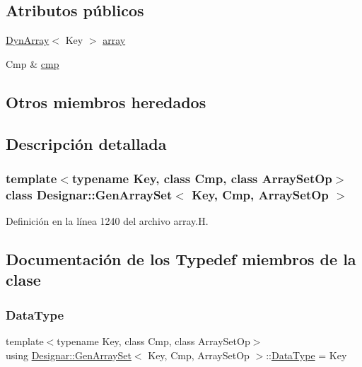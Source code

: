 \subsection*{Atributos públicos}
\begin{DoxyCompactItemize}
\item 
\hyperlink{class_designar_1_1_dyn_array}{Dyn\+Array}$<$ Key $>$ \hyperlink{class_designar_1_1_gen_array_set_a8118f689e762c993ed0ba7394a8f480a}{array}
\item 
Cmp \& \hyperlink{class_designar_1_1_gen_array_set_a2b1e3c653865a794eab7d19e43c1b0de}{cmp}
\end{DoxyCompactItemize}
\subsection*{Otros miembros heredados}


\subsection{Descripción detallada}
\subsubsection*{template$<$typename Key, class Cmp, class Array\+Set\+Op$>$\newline
class Designar\+::\+Gen\+Array\+Set$<$ Key, Cmp, Array\+Set\+Op $>$}



Definición en la línea 1240 del archivo array.\+H.



\subsection{Documentación de los \textquotesingle{}Typedef\textquotesingle{} miembros de la clase}
\mbox{\label{class_designar_1_1_gen_array_set_ac69f0c0b76358cd5effd2dc05bd724ee}} 
\subsubsection{\texorpdfstring{Data\+Type}{DataType}}
{\footnotesize\ttfamily template$<$typename Key, class Cmp, class Array\+Set\+Op$>$ \\
using \hyperlink{class_designar_1_1_gen_array_set}{Designar\+::\+Gen\+Array\+Set}$<$ Key, Cmp, Array\+Set\+Op $>$\+::\hyperlink{class_designar_1_1_gen_array_set_ac69f0c0b76358cd5effd2dc05bd724ee}{Data\+Type} =  Key}



